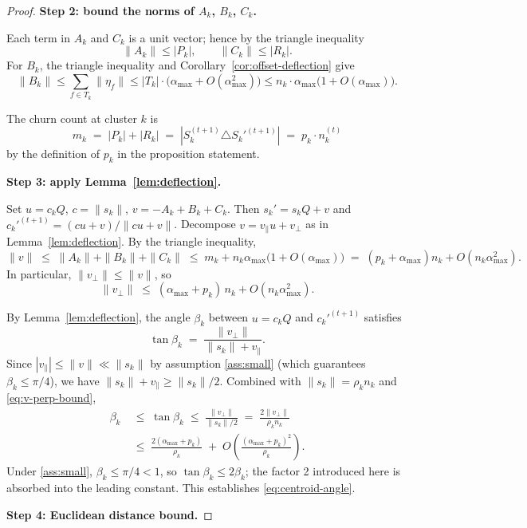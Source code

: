 \documentclass[11pt,letterpaper]{article}
\theoremstyle{definition}
\begin{document}
\begin{proof}
\textbf{Step 2: bound the norms of $A_k$, $B_k$, $C_k$.}

Each term in $A_k$ and $C_k$ is a unit vector; hence by the triangle inequality
\[
\|A_k\| \leq |P_k|, \qquad \|C_k\| \leq |R_k|.
\]
For $B_k$, the triangle inequality and Corollary~\ref{cor:offset-deflection} give
\[
\|B_k\| \leq \sum_{f \in T_k} \|\eta_f\| \leq |T_k| \cdot \big(\alpha_{\max} + O(\alpha_{\max}^2)\big) \leq n_k \cdot \alpha_{\max} \big(1 + O(\alpha_{\max})\big).
\]

The churn count at cluster $k$ is
\[
m_k \;=\; |P_k| + |R_k| \;=\; |S_k^{(t+1)} \triangle S_k'^{(t+1)}| \;=\; p_k \cdot n_k^{(t)}
\]
by the definition of $p_k$ in the proposition statement.

\textbf{Step 3: apply Lemma~\ref{lem:deflection}.}

Set $u = c_k Q$, $c = \|s_k\|$, $v = -A_k + B_k + C_k$. Then $s_k' = s_k Q + v$ and $c_k'^{(t+1)} = (cu + v)/\|cu + v\|$. Decompose $v = v_\parallel u + v_\perp$ as in Lemma~\ref{lem:deflection}. By the triangle inequality,
\[
\|v\| \;\leq\; \|A_k\| + \|B_k\| + \|C_k\| \;\leq\; m_k + n_k \alpha_{\max} \big(1 + O(\alpha_{\max})\big) \;=\; (p_k + \alpha_{\max}) n_k + O(n_k \alpha_{\max}^2).
\]
In particular, $\|v_\perp\| \leq \|v\|$, so
\begin{equation}
\|v_\perp\| \;\leq\; (\alpha_{\max} + p_k) \, n_k + O(n_k \alpha_{\max}^2).
\label{eq:v-perp-bound}
\end{equation}

By Lemma~\ref{lem:deflection}, the angle $\beta_k$ between $u = c_k Q$ and $c_k'^{(t+1)}$ satisfies
\[
\tan \beta_k \;=\; \frac{\|v_\perp\|}{\|s_k\| + v_\parallel}.
\]
Since $|v_\parallel| \leq \|v\| \ll \|s_k\|$ by assumption \ref{ass:small} (which guarantees $\beta_k \leq \pi/4$), we have $\|s_k\| + v_\parallel \geq \|s_k\|/2$. Combined with $\|s_k\| = \rho_k n_k$ and \eqref{eq:v-perp-bound},
\begin{align}
\beta_k &\;\leq\; \tan \beta_k \;\leq\; \frac{\|v_\perp\|}{\|s_k\|/2} \;=\; \frac{2 \|v_\perp\|}{\rho_k n_k} \nonumber \\
&\;\leq\; \frac{2(\alpha_{\max} + p_k)}{\rho_k} \;+\; O\!\left( \frac{(\alpha_{\max} + p_k)^2}{\rho_k} \right). \label{eq:beta-bound}
\end{align}
Under \ref{ass:small}, $\beta_k \leq \pi/4 < 1$, so $\tan\beta_k \leq 2\beta_k$; the factor 2 introduced here is absorbed into the leading constant. This establishes \eqref{eq:centroid-angle}.

\textbf{Step 4: Euclidean distance bound.}


\end{proof}
\end{document}
